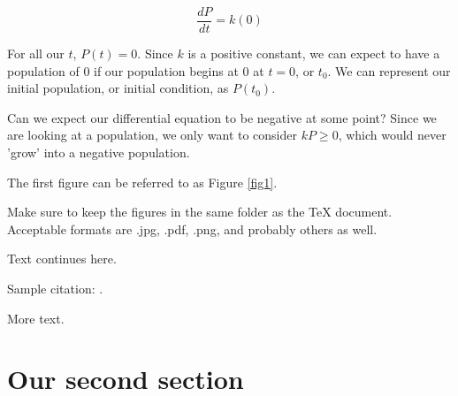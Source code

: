 \documentclass{amsart}
\theoremstyle{definition}
\numberwithin{equation}{section}
\begin{document}
\begin{sansmath}
\[ \frac{dP}{dt} = k(0)\]

For all our $t$, $P(t) = 0$. Since $k$ is a positive constant, we can expect to have a population of $0$ if our population begins at $0$ at $t = 0$, or $t_0$. We can represent our initial population, or initial condition, as $P(t_0)$.

Can we expect our differential equation to be negative at some point? Since we are looking at a population, we only want to consider $kP \geq 0$, which would never 'grow' into a negative population.

\newpage

%





The first figure can be referred to as  Figure \ref{fig1}.

Make sure to keep the figures in the same folder as the TeX document.
Acceptable formats are .jpg, .pdf, .png, and probably others as well.

Text continues here.

Sample citation:  \cite{alexandrov}.

More text.

\section{Our second section}


\end{sansmath}
\end{document}
